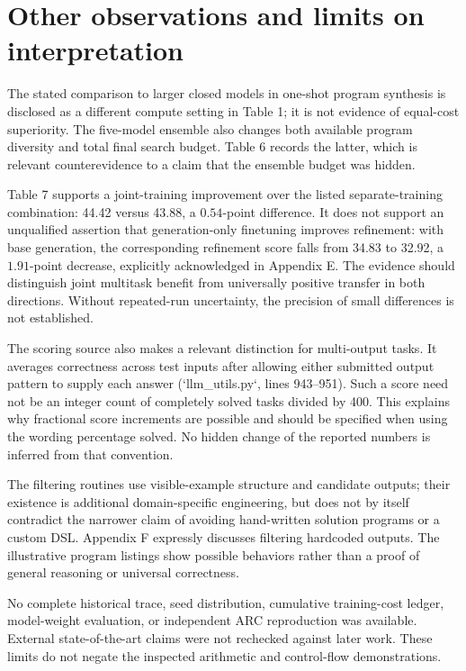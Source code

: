 \documentclass[10pt]{article}
\begin{document}
\section*{Other observations and limits on interpretation}
The stated comparison to larger closed models in one-shot program synthesis is disclosed as a different compute setting in Table 1; it is not evidence of equal-cost superiority. The five-model ensemble also changes both available program diversity and total final search budget. Table 6 records the latter, which is relevant counterevidence to a claim that the ensemble budget was hidden.\par
Table 7 supports a joint-training improvement over the listed separate-training combination: 44.42 versus 43.88, a \(0.54\)-point difference. It does not support an unqualified assertion that generation-only finetuning improves refinement: with base generation, the corresponding refinement score falls from 34.83 to 32.92, a \(1.91\)-point decrease, explicitly acknowledged in Appendix E. The evidence should distinguish joint multitask benefit from universally positive transfer in both directions. Without repeated-run uncertainty, the precision of small differences is not established.\par
The scoring source also makes a relevant distinction for multi-output tasks. It averages correctness across test inputs after allowing either submitted output pattern to supply each answer (`llm\_utils.py`, lines 943–951). Such a score need not be an integer count of completely solved tasks divided by 400. This explains why fractional score increments are possible and should be specified when using the wording percentage solved. No hidden change of the reported numbers is inferred from that convention.\par
The filtering routines use visible-example structure and candidate outputs; their existence is additional domain-specific engineering, but does not by itself contradict the narrower claim of avoiding hand-written solution programs or a custom DSL. Appendix F expressly discusses filtering hardcoded outputs. The illustrative program listings show possible behaviors rather than a proof of general reasoning or universal correctness.\par
No complete historical trace, seed distribution, cumulative training-cost ledger, model-weight evaluation, or independent ARC reproduction was available. External state-of-the-art claims were not rechecked against later work. These limits do not negate the inspected arithmetic and control-flow demonstrations.\par
\end{document}
